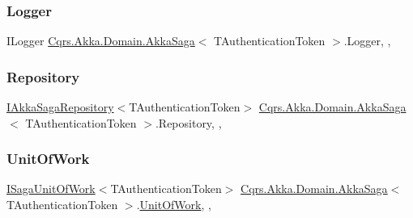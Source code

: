 \subsubsection{\texorpdfstring{Logger}{Logger}}
{\footnotesize\ttfamily I\+Logger \hyperlink{classCqrs_1_1Akka_1_1Domain_1_1AkkaSaga}{Cqrs.\+Akka.\+Domain.\+Akka\+Saga}$<$ T\+Authentication\+Token $>$.Logger\hspace{0.3cm}{\ttfamily [get]}, {\ttfamily [set]}, {\ttfamily [protected]}}

\mbox{\label{classCqrs_1_1Akka_1_1Domain_1_1AkkaSaga_a4c0662a1aa78c8de5fa32c71a54cf393_a4c0662a1aa78c8de5fa32c71a54cf393}} 
\subsubsection{\texorpdfstring{Repository}{Repository}}
{\footnotesize\ttfamily \hyperlink{interfaceCqrs_1_1Akka_1_1Domain_1_1IAkkaSagaRepository}{I\+Akka\+Saga\+Repository}$<$T\+Authentication\+Token$>$ \hyperlink{classCqrs_1_1Akka_1_1Domain_1_1AkkaSaga}{Cqrs.\+Akka.\+Domain.\+Akka\+Saga}$<$ T\+Authentication\+Token $>$.Repository\hspace{0.3cm}{\ttfamily [get]}, {\ttfamily [set]}, {\ttfamily [protected]}}

\mbox{\label{classCqrs_1_1Akka_1_1Domain_1_1AkkaSaga_addbf93da18d577da8f8f1e2dba5cafb9_addbf93da18d577da8f8f1e2dba5cafb9}} 
\subsubsection{\texorpdfstring{Unit\+Of\+Work}{UnitOfWork}}
{\footnotesize\ttfamily \hyperlink{interfaceCqrs_1_1Domain_1_1ISagaUnitOfWork}{I\+Saga\+Unit\+Of\+Work}$<$T\+Authentication\+Token$>$ \hyperlink{classCqrs_1_1Akka_1_1Domain_1_1AkkaSaga}{Cqrs.\+Akka.\+Domain.\+Akka\+Saga}$<$ T\+Authentication\+Token $>$.\hyperlink{classCqrs_1_1Domain_1_1UnitOfWork}{Unit\+Of\+Work}\hspace{0.3cm}{\ttfamily [get]}, {\ttfamily [set]}, {\ttfamily [protected]}}

